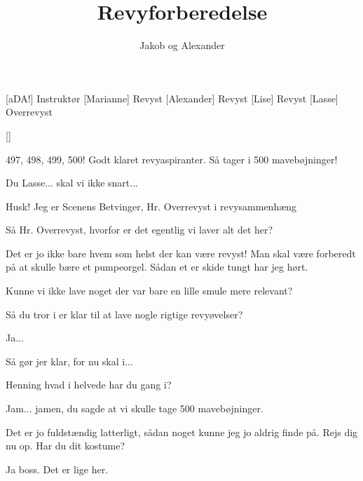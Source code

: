 \documentclass[a4paper,11pt]{article}
\title{Revyforberedelse}
\author{Jakob og Alexander}
\begin{document}
\maketitle

\begin{roles}
[aDA!] Instruktør
[Marianne] Revyst
[Alexander] Revyst
[Lise] Revyst
[Lasse] Overrevyst
\end{roles}

\begin{props}
[]
\end{props}

\begin{sketch}

 497, 498, 499, 500! Godt klaret revyaspiranter. Så tager i 500 mavebøjninger!


 Du Lasse... skal vi ikke snart...

 Husk! Jeg er Scenens Betvinger, Hr. Overrevyst i revysammenhæng

 Så Hr. Overrevyst, hvorfor er det egentlig vi laver alt det her?

 Det er jo ikke bare hvem som helst der kan være revyst! Man skal være forberedt på at skulle bære et pumpeorgel. Sådan et er skide tungt har jeg hørt.

 Kunne vi ikke lave noget der var bare en lille smule mere relevant?

 Så du tror i er klar til at lave nogle rigtige revyøvelser?

 Ja...

 Så gør jer klar, for nu skal i...


 Henning hvad i helvede har du gang i?

 Jam... jamen, du sagde at vi skulle tage 500 mavebøjninger.

 Det er jo fuldstændig latterligt, sådan noget kunne jeg jo aldrig finde på. Rejs dig nu op. Har du dit kostume?

 Ja boss. Det er lige her.



\end{sketch}
\end{document}
